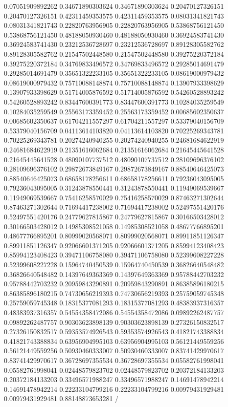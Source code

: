    0.07051909892262   0.34671890303624
   0.34671890303624   0.20470127326151
   0.20470127326151   0.42311459353575
   0.42311459353575   0.08031341821743
   0.08031341821743   0.22820763956905
   0.22820763956905   0.53868756121450
   0.53868756121450   0.48188050930460
   0.48188050930460   0.36924583741430
   0.36924583741430   0.23212536728697
   0.23212536728697   0.89128305582762
   0.89128305582762   0.21547502448580
   0.21547502448580   0.39275220372184
   0.39275220372184   0.34769833496572
   0.34769833496572   0.29285014691479
   0.29285014691479   0.35651322233105
   0.35651322233105   0.08619000979432
   0.08619000979432   0.75710088148874
   0.75710088148874   0.13907933398629
   0.13907933398629   0.51714005876592
   0.51714005876592   0.54260528893242
   0.54260528893242   0.83447600391773
   0.83447600391773   0.10284035259549
   0.10284035259549   0.25563173359452
   0.25563173359452   0.00685602350637
   0.00685602350637   0.61704211557297
   0.61704211557297   0.53379040156709
   0.53379040156709   0.04113614103820
   0.04113614103820   0.70225269343781
   0.70225269343781   0.20274240940255
   0.20274240940255   0.24681684622919
   0.24681684622919   0.21351616062684
   0.21351616062684   0.21645445641528
   0.21645445641528   0.48090107737512
   0.48090107737512   0.28109696376102
   0.28109696376102   0.29872673849167
   0.29872673849167   0.88540646425073
   0.88540646425073   0.68658178256611
   0.68658178256611   0.79236043095005
   0.79236043095005   0.31243878550441
   0.31243878550441   0.11949069539667
   0.11949069539667   0.75416258570029
   0.75416258570029   0.87463271302644
   0.87463271302644   0.71694417238002
   0.71694417238002   0.52497551420176
   0.52497551420176   0.24779627815867
   0.24779627815867   0.30166503428012
   0.30166503428012   0.14985308521058
   0.14985308521058   0.48677766895201
   0.48677766895201   0.80999020568071
   0.80999020568071   0.89911851126347
   0.89911851126347   0.92066601371205
   0.92066601371205   0.85994123408423
   0.85994123408423   0.39471106758080
   0.39471106758080   0.52399608227228
   0.52399608227228   0.15964740450539
   0.15964740450539   0.36826640548482
   0.36826640548482   0.14397649363369
   0.14397649363369   0.95788442703232
   0.95788442703232   0.20959843290891
   0.20959843290891   0.86385896180215
   0.86385896180215   0.74730656219393
   0.74730656219393   0.25759059745348
   0.25759059745348   0.18315377081293
   0.18315377081293   0.48383937316357
   0.48383937316357   0.54554358472086
   0.54554358472086   0.09892262487757
   0.09892262487757   0.90303623898139
   0.90303623898139   0.27326150832517
   0.27326150832517   0.59353574926543
   0.59353574926543   0.41821743388834
   0.41821743388834   0.63956904995103
   0.63956904995103   0.56121449559256
   0.56121449559256   0.50930460333007
   0.50930460333007   0.83741429970617
   0.83741429970617   0.36728697355534
   0.36728697355534   0.05582761998041
   0.05582761998041   0.02448579823702
   0.02448579823702   0.20372184133203
   0.20372184133203   0.33496571988247
   0.33496571988247   0.14691478942214
   0.14691478942214   0.22233104799216
   0.22233104799216   0.00979431929481
   0.00979431929481   0.88148873653281
/ 